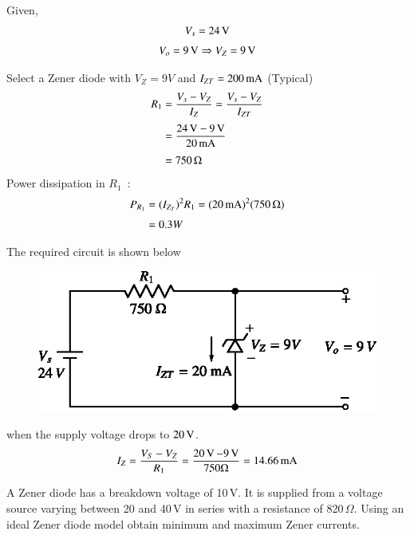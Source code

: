 \begin{solution}
Given,
\begin{gather*}
V_{s}=24\text{\,V}\\[3pt]
V_{o}=9\text{\,V}\Rightarrow V_{Z}=9\text{\,V}
\end{gather*}

Select a Zener diode with $V_{Z}=9V$ and $I_{ZT}=200\operatorname{mA}$ (Typical)
\begin{align*}
R_{1} &= \frac{V_{s}-V_{Z}}{I_{Z}}=\frac{V_{s}-V_{Z}}{I_{ZT}}\\[3pt]
&=\frac{24\text{\,V}-9\text{\,V}}{20\text{\,mA}}\\[3pt]
&= 750\,\Omega
\end{align*}
Power dissipation in $R_{1}$~:
\begin{align*}
P_{R_{1}} &= (I_{Z_{T}})^{2}R_{1}=(20\text{\,mA})^{2}(750\,\Omega)\\[3pt]
&= 0.3W
\end{align*}

\eject

The required circuit is shown below
\begin{figure}[H]
\centering
\includegraphics{chap2/sol2.27.eps}
\end{figure}
when the supply voltage drops to $20\operatorname{\mathrm{V}}$.
$$
I_{Z}=\dfrac{V_{S}-V_{Z}}{R_{1}}=\dfrac{20\operatorname{\mathrm{V}}-9\operatorname{\mathrm{V}}}{750\Omega}=14.66\text{\,mA}
$$
\vskip -1cm
\end{solution}

\begin{example}\label{exam2.28}
A Zener diode has a breakdown voltage of 10\,V. It is supplied from a voltage source varying between 20 and 40\,V in series with a resistance of 820\,$\Omega$. Using an ideal Zener diode model obtain minimum and maximum Zener currents. 
\end{example}

